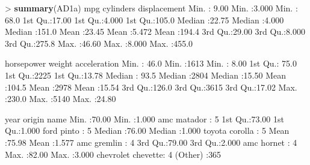 \documentclass[]{article}
\newenvironment{Shaded}{\begin{snugshade}}{\end{snugshade}}
\newcommand{\KeywordTok}[1]{\textcolor[rgb]{0.13,0.29,0.53}{\textbf{{#1}}}}
\newcommand{\DecValTok}[1]{\textcolor[rgb]{0.00,0.00,0.81}{{#1}}}
\newcommand{\FloatTok}[1]{\textcolor[rgb]{0.00,0.00,0.81}{{#1}}}
\newcommand{\StringTok}[1]{\textcolor[rgb]{0.31,0.60,0.02}{{#1}}}
\newcommand{\NormalTok}[1]{{#1}}
\begin{document}
\begin{Shaded}
\begin{Highlighting}[]
\NormalTok{>}\StringTok{ }\KeywordTok{summary}\NormalTok{(AD1a)}
      \NormalTok{mpg          cylinders      displacement  }
 \NormalTok{Min.   :}\StringTok{ }\FloatTok{9.00}   \NormalTok{Min.   :}\FloatTok{3.000}   \NormalTok{Min.   :}\StringTok{ }\FloatTok{68.0}  
 \NormalTok{1st Qu.:}\FloatTok{17.00}   \NormalTok{1st Qu.:}\FloatTok{4.000}   \NormalTok{1st Qu.:}\FloatTok{105.0}  
 \NormalTok{Median :}\FloatTok{22.75}   \NormalTok{Median :}\FloatTok{4.000}   \NormalTok{Median :}\FloatTok{151.0}  
 \NormalTok{Mean   :}\FloatTok{23.45}   \NormalTok{Mean   :}\FloatTok{5.472}   \NormalTok{Mean   :}\FloatTok{194.4}  
 \NormalTok{3rd Qu.:}\FloatTok{29.00}   \NormalTok{3rd Qu.:}\FloatTok{8.000}   \NormalTok{3rd Qu.:}\FloatTok{275.8}  
 \NormalTok{Max.   :}\FloatTok{46.60}   \NormalTok{Max.   :}\FloatTok{8.000}   \NormalTok{Max.   :}\FloatTok{455.0}  
                                                
   \NormalTok{horsepower        weight      acceleration  }
 \NormalTok{Min.   :}\StringTok{ }\FloatTok{46.0}   \NormalTok{Min.   :}\DecValTok{1613}   \NormalTok{Min.   :}\StringTok{ }\FloatTok{8.00}  
 \NormalTok{1st Qu.:}\StringTok{ }\FloatTok{75.0}   \NormalTok{1st Qu.:}\DecValTok{2225}   \NormalTok{1st Qu.:}\FloatTok{13.78}  
 \NormalTok{Median :}\StringTok{ }\FloatTok{93.5}   \NormalTok{Median :}\DecValTok{2804}   \NormalTok{Median :}\FloatTok{15.50}  
 \NormalTok{Mean   :}\FloatTok{104.5}   \NormalTok{Mean   :}\DecValTok{2978}   \NormalTok{Mean   :}\FloatTok{15.54}  
 \NormalTok{3rd Qu.:}\FloatTok{126.0}   \NormalTok{3rd Qu.:}\DecValTok{3615}   \NormalTok{3rd Qu.:}\FloatTok{17.02}  
 \NormalTok{Max.   :}\FloatTok{230.0}   \NormalTok{Max.   :}\DecValTok{5140}   \NormalTok{Max.   :}\FloatTok{24.80}  
                                               
      \NormalTok{year           origin                      name    }
 \NormalTok{Min.   :}\FloatTok{70.00}   \NormalTok{Min.   :}\FloatTok{1.000}   \NormalTok{amc matador       :}\StringTok{  }\DecValTok{5}  
 \NormalTok{1st Qu.:}\FloatTok{73.00}   \NormalTok{1st Qu.:}\FloatTok{1.000}   \NormalTok{ford pinto        :}\StringTok{  }\DecValTok{5}  
 \NormalTok{Median :}\FloatTok{76.00}   \NormalTok{Median :}\FloatTok{1.000}   \NormalTok{toyota corolla    :}\StringTok{  }\DecValTok{5}  
 \NormalTok{Mean   :}\FloatTok{75.98}   \NormalTok{Mean   :}\FloatTok{1.577}   \NormalTok{amc gremlin       :}\StringTok{  }\DecValTok{4}  
 \NormalTok{3rd Qu.:}\FloatTok{79.00}   \NormalTok{3rd Qu.:}\FloatTok{2.000}   \NormalTok{amc hornet        :}\StringTok{  }\DecValTok{4}  
 \NormalTok{Max.   :}\FloatTok{82.00}   \NormalTok{Max.   :}\FloatTok{3.000}   \NormalTok{chevrolet chevette:}\StringTok{  }\DecValTok{4}  
                                 \NormalTok{(Other)           :}\DecValTok{365}  
\end{Highlighting}
\end{Shaded}
\end{document}
